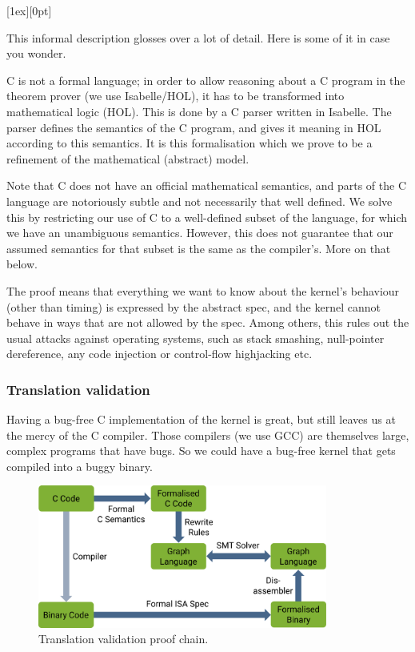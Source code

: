 \documentclass[english,a4paper,12pt]{report}
\newcommand{\SSSect}[1]{\subsubsection*{#1}}
\newcommand{\SSSect}[1]{\subsection*{#1}}
\newlength{\chillilng}\setlength{\chillilng}{8mm}
\newlength{\chillimarg}\setlength{\chillimarg}{10mm}
\newcommand{\chilli}{\texttt{[image: chilli]}}
\newcommand{\chilliItem}{\raisebox{-5mm}[1ex][0pt]{%
      \makebox[\chillilng][r]{\chilli}}}
\newenvironment{Chilli}{
    \begin{list}{}{
      \setlength{\labelwidth}{\chillilng}
      \setlength{\leftmargin}{\chillimarg}}
    \item[\chilliItem]
    }
  {\end{list}}
\begin{document}
  \begin{Chilli}
    This informal description glosses over a lot of detail. Here is some
    of it in case you wonder.

    C is not a formal language; in order to allow reasoning about a C
    program in the theorem prover (we use Isabelle/HOL), it has to be
    transformed into mathematical logic (HOL). This is done by a C
    parser written in Isabelle. The parser defines the semantics of
    the C program, and gives it meaning in HOL according to this semantics.
    It is this formalisation
    which we prove to be a refinement of the mathematical (abstract) model.

    Note that C does not have an official mathematical semantics, and
    parts of the C language are notoriously subtle and not necessarily
    that well defined. We solve this by restricting our use of C to a
    well-defined subset of the language, for which we have an
    unambiguous semantics. However, this does not guarantee that our
    assumed semantics for that subset is the same as the
    compiler's. More on that below.
  \end{Chilli}

  The  proof means that everything we want to
  know about the kernel's behaviour (other than timing) is expressed
  by the abstract spec, and the kernel cannot behave in ways that are
  not allowed by the spec. Among others, this rules out the usual
  attacks against operating systems, such as stack smashing,
  null-pointer dereference, any code injection or control-flow highjacking etc.

  \SSSect{Translation validation}

  Having a bug-free C implementation of the kernel is great, but still
  leaves us at the mercy of the C compiler. Those compilers (we use
  GCC) are themselves large, complex programs that have
  bugs. So we could have a bug-free kernel that gets compiled into a
  buggy binary.

  \begin{figure}[th]
    \centering
    \includegraphics[width=0.85\textwidth]{binary}
    \caption{Translation validation proof chain.}
    \label{f:binary}
  \end{figure}
\end{document}
